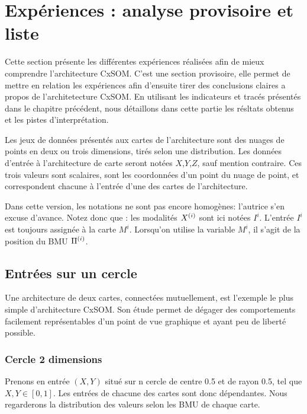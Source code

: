 \chapter{Expériences : analyse provisoire et liste}
\graphicspath{{04-Analyse/}}

Cette section présente les différentes expériences réalisées afin de mieux comprendre l'architecture CxSOM. C'est une section provisoire, elle permet de mettre en relation les expériences afin d'ensuite tirer des conclusions claires a propos de l'architetecture CxSOM.
En utilisant les indicateurs et tracés présentés dans le chapitre précédent, nous détaillons dans cette partie les résltats obtenus et les pistes d'interprétation.

Les jeux de données présentés aux cartes de l'architecture sont des nuages de points en deux ou trois dimensions, tirés selon une distribution.
Les données d'entrée à l'architecture de carte seront notées $X$,$Y$,$Z$, sauf mention contraire. Ces trois valeurs sont scalaires, sont les coordonnées d'un point du nuage de point, et correspondent chacune à l'entrée d'une des cartes de l'architecture.

Dans cette version, les notations ne sont pas encore homogènes: l'autrice s'en excuse d'avance. Notez donc que : 
les modalités $X^{({i})}$ sont ici notées $I^i$. L'entrée $I^i$ est toujours assignée à la carte $M^i$. Lorsqu'on utilise la variable $M^i$, il s'agit de la position du BMU $\Pi^{({i})}$.

\section{Entrées sur un cercle}

Une architecture de deux cartes, connectées mutuellement, est l'exemple le plus simple d'architecture CxSOM. Son étude permet de dégager des comportements facilement représentables d'un point de vue graphique et ayant peu de liberté possible. 


\subsection{Cercle 2 dimensions}
Prenons en entrée $(X,Y)$ situé sur n cercle de centre 0.5 et de rayon 0.5, tel que $X,Y \in [0,1]$. 
Les entrées de chacune des cartes sont donc dépendantes. Nous regarderons la distribution des valeurs selon les BMU de chaque carte.

